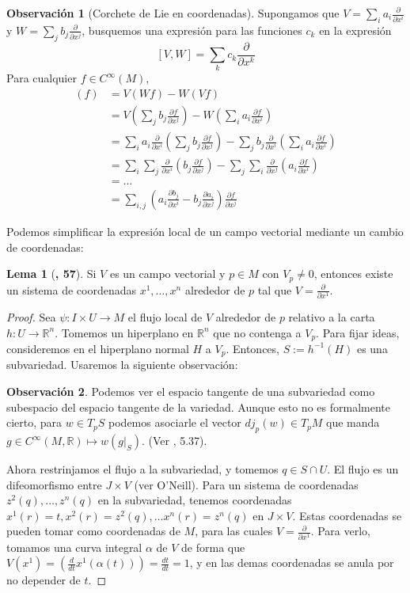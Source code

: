 \documentclass[spanish]{book}
\theoremstyle{definition}
\newtheorem*{lema}{Lema}
\newtheorem*{obs}{Observación}
\newcommand{\R}{\mathbb{R}}
\newcommand{\Cinf}{C^\infty}
\begin{document}
	\begin{obs}[Corchete de Lie en coordenadas]
		Supongamos que $V=\sum_ia_i\frac{\partial}{\partial x^i}$ y $W=\sum_jb_j\frac{\partial}{\partial x^j}$, busquemos una expresión para las funciones $c_k$ en la expresión \[[V,W]=\sum_kc_k\frac{\partial}{\partial x^k}\]
		Para cualquier $f\in\Cinf(M)$,
		\begin{align*}
			[V,W](f)&=V(Wf)-W(Vf)\\
			&=V\left(\sum_jb_j\frac{\partial f}{\partial x^j}\right)-W\left(\sum_ia_i\frac{\partial f}{\partial x^i}\right)\\
			&=\sum_ia_i\frac{\partial }{\partial x^i}\left(\sum_jb_j\frac{\partial f}{\partial x^j}\right)-\sum_jb_j\frac{\partial }{\partial x^i}\left(\sum_ia_i\frac{\partial f}{\partial x^i}\right)\\
			&=\sum_i\sum_j\frac{\partial}{\partial x^i}\left(b_j\frac{\partial f}{\partial x^j}\right)-\sum_j\sum_i\frac{\partial}{\partial x^j}\left(a_i\frac{\partial f}{\partial x^i}\right)\\
			&=\ldots\\
			&=\sum_{i,j}\left(a_i\frac{\partial b_j}{\partial x^i}-b_j\frac{\partial a_i}{\partial x^j}\right)\frac{\partial f}{\partial x^j}
		\end{align*}
	\end{obs}
	Podemos simplificar la expresión local de un campo vectorial mediante un cambio de coordenadas:	
	\begin{lema}[\cite{ONeill}\textbf{, 57}]
		Si $V$ es un campo vectorial y $p\in M$ con $V_p\neq0$, entonces existe un sistema de coordenadas $x^1,\ldots,x^n$ alrededor de $p$ tal que $V=\frac{\partial}{\partial x^1}$.
	\end{lema}
	\begin{proof}
		Sea $\psi:I\times U\to M$ el flujo local de $V$ alrededor de $p$ relativo a la carta $h:U\to\R^n$. Tomemos un hiperplano en $\R^n$ que no contenga a $V_p$. Para fijar ideas, consideremos en el hiperplano normal $H$ a $V_p$. Entonces, $S:=h^{-1}(H)$ es una subvariedad. Usaremos la siguiente observación:
		\begin{obs}
			Podemos ver el espacio tangente de una subvariedad como subespacio del espacio tangente de la variedad. Aunque esto no es formalmente cierto, para $w\in T_pS$ podemos asociarle el vector $dj_p(w)\in T_pM$ que manda $g\in\Cinf(M,\R)\mapsto w(g|_S)$. (Ver \cite{Lee}, 5.37).
		\end{obs}
		Ahora restrinjamos el flujo a la subvariedad, y tomemos $q\in S\cap U$. El flujo es un difeomorfismo entre $J\times V$ (ver O'Neill). Para un sistema de coordenadas $z^2(q),\ldots,z^n(q)$ en la subvariedad, tenemos coordenadas $x^1(r)=t,x^2(r)=z^2(q),\ldots x^n(r)=z^n(q)$ en $ J\times V$. Estas coordenadas se pueden tomar como coordenadas de $M$, para las cuales $V=\frac{\partial}{\partial x^1}$. Para verlo, tomamos una curva integral $\alpha$ de $V$ de forma que $V(x^1)=(\frac{d}{dt}x^1(\alpha(t)))=\frac{dt}{dt}=1$, y en las demas coordenadas se anula por no depender de $t$.
	\end{proof}
\end{document}
